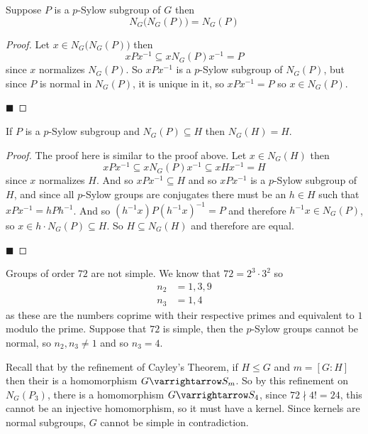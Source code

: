 \documentclass[10pt]{article}
\begin{document}
\begin{prop*}

    Suppose $P$ is a $p$-Sylow subgroup of $G$ then
    \[ N_G\bigl(N_G(P)\bigr) = N_G(P) \]

\end{prop*}

\begin{proof}

    Let $x\in N_G\bigl(N_G(P)\bigr)$ then
    \[ xPx^{-1}\subseteq xN_G(P)x^{-1} = P \]
    since $x$ normalizes $N_G(P)$.
    So $xPx^{-1}$ is a $p$-Sylow subgroup of $N_G(P)$, but since $P$ is normal in $N_G(P)$, it is unique in it, so $xPx^{-1}=P$ so $x\in N_G(P)$.

    \hfill$\blacksquare$

\end{proof}

\begin{prop*}

    If $P$ is a $p$-Sylow subgroup and $N_G(P)\subseteq H$ then $N_G(H)=H$.

\end{prop*}

\begin{proof}

    The proof here is similar to the proof above.
    Let $x\in N_G(H)$ then
    \[ xPx^{-1}\subseteq xN_G(P)x^{-1}\subseteq xHx^{-1} = H \]
    since $x$ normalizes $H$.
    And so $xPx^{-1}\subseteq H$ and so $xPx^{-1}$ is a $p$-Sylow subgroup of $H$, and since all $p$-Sylow groups are conjugates there must be an $h\in H$ such that $xPx^{-1}=hPh^{-1}$.
    And so $(h^{-1}x)P(h^{-1}x)^{-1}=P$ and therefore $h^{-1}x\in N_G(P)$, so $x\in h\cdot N_G(P)\subseteq H$.
    So $H\subseteq N_G(H)$ and therefore are equal.

    \hfill$\blacksquare$

\end{proof}

\begin{exam*}

    Groups of order $72$ are not simple.
    We know that $72=2^3\cdot3^2$ so
    \begin{align*}
    n_2 &= 1, 3, 9 \\
    n_3 &= 1, 4
    \end{align*}
    as these are the numbers coprime with their respective primes and equivalent to $1$ modulo the prime.
    Suppose that $72$ is simple, then the $p$-Sylow groups cannot be normal, so $n_2,n_3\neq1$ and so $n_3=4$.

    Recall that by the refinement of Cayley's Theorem, if $H\leq G$ and $m=[G:H]$ then their is a homomorphism $G\varrightarrow S_m$.
    So by this refinement on $N_G(P_3)$, there is a homomorphism $G\varrightarrow S_4$, since $72\nmid4!=24$, this cannot be an injective homomorphism, so it must have a kernel.
    Since kernels are normal subgroups, $G$ cannot be simple in contradiction.

\end{exam*}
\end{document}
